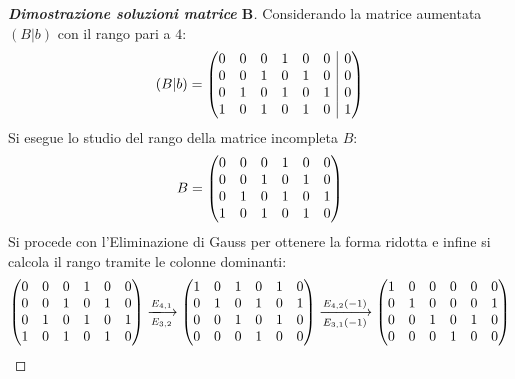 \documentclass[a4paper]{article}
\makeatletter
\newenvironment{rowequmat}[1]{\left(\array{@{}#1@{}}}{\endarray\right)}
\makeatother
\begin{document}
	\begin{proof}[\textbf{Dimostrazione soluzioni matrice} $\boldsymbol{B}$]
		Considerando la matrice aumentata $\left(B|b\right)$ con il rango pari a $4$:
		\begin{equation*}
			\left(B|b\right) = \begin{rowequmat}{cccccc|c}
				0 & 0 & 0 & 1 & 0 & 0 & 0 \\
				0 & 0 & 1 & 0 & 1 & 0 & 0 \\
				0 & 1 & 0 & 1 & 0 & 1 & 0 \\
				1 & 0 & 1 & 0 & 1 & 0 & 1
			\end{rowequmat}
		\end{equation*}
		Si esegue lo studio del rango della matrice incompleta $B$:
		\begin{equation*}
			B = \begin{rowequmat}{cccccc}
				0 & 0 & 0 & 1 & 0 & 0 \\
				0 & 0 & 1 & 0 & 1 & 0 \\
				0 & 1 & 0 & 1 & 0 & 1 \\
				1 & 0 & 1 & 0 & 1 & 0
			\end{rowequmat}
		\end{equation*}
		Si procede con l'Eliminazione di Gauss per ottenere la forma ridotta e infine si calcola il rango tramite le colonne dominanti:
		\begin{gather*}
			\begin{rowequmat}{cccccc}
				0 & 0 & 0 & 1 & 0 & 0 \\
				0 & 0 & 1 & 0 & 1 & 0 \\
				0 & 1 & 0 & 1 & 0 & 1 \\
				1 & 0 & 1 & 0 & 1 & 0
			\end{rowequmat} \xlongrightarrow[E_{3,2}]{E_{4,1}}
			\begin{rowequmat}{cccccc}
				1 & 0 & 1 & 0 & 1 & 0 \\
				0 & 1 & 0 & 1 & 0 & 1 \\
				0 & 0 & 1 & 0 & 1 & 0 \\
				0 & 0 & 0 & 1 & 0 & 0
			\end{rowequmat} \xlongrightarrow[E_{3,1}\left(-1\right)]{E_{4,2}\left(-1\right)}
			\begin{rowequmat}{cccccc}
				1 & 0 & 0 & 0 & 0 & 0 \\
				0 & 1 & 0 & 0 & 0 & 1 \\
				0 & 0 & 1 & 0 & 1 & 0 \\
				0 & 0 & 0 & 1 & 0 & 0
			\end{rowequmat}

\end{gather*}
\end{proof}
\end{document}
